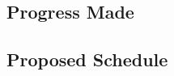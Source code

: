 \documentclass[12pt]{article}
\begin{document}
\subsection{Progress Made}
\subsection{Proposed Schedule}





\end{document}
